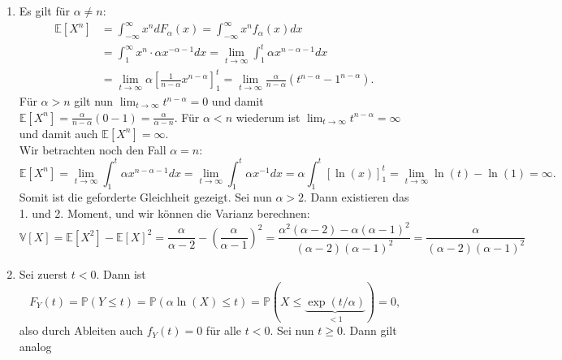 \documentclass[a4paper]{article}
\begin{document}
\begin{enumerate}[label=(\alph*)]
	\item Es gilt für $\alpha \neq n$:
	      \begin{align*}
		      \mathds{E}[X^n] & = \int_{-\infty}^{\infty} x^n dF_\alpha(x) = \int_{-\infty}^{\infty} x^n f_\alpha(x) dx                                                                                             \\
		                      & = \int_{1}^{\infty} x^n \cdot \alpha x^{-\alpha - 1} dx = \lim_{t \to \infty} \int_{1}^{t} \alpha x^{n - \alpha - 1} dx                                                             \\
		                      & = \lim_{t \to \infty} \alpha \left[\frac{1}{n - \alpha} x^{n - \alpha}\right]_1^t = \lim_{t \to \infty} \frac{\alpha}{n - \alpha} \left(t^{n-\alpha} - 1^{n-\alpha}\right) \text{.}
	      \end{align*}
	      Für $\alpha > n$ gilt nun $\lim_{t \to \infty} t^{n - \alpha} = 0$ und damit $\mathds{E}[X^n] = \frac{\alpha}{n - \alpha} (0 - 1) = \frac{\alpha}{\alpha - n}$. Für $\alpha < n$ wiederum ist $\lim_{t \to \infty} t^{n - \alpha} = \infty$ und damit auch $\mathds{E}[X^n] = \infty$. \\
	      Wir betrachten noch den Fall $\alpha = n$:
	      \begin{equation*}
		      \mathds{E}[X^n] = \lim_{t \to \infty} \int_{1}^{t} \alpha x^{n - \alpha - 1} dx = \lim_{t \to \infty} \int_{1}^t \alpha x^{-1} dx = \alpha \int_{1}^t \left[\ln(x)\right]_1^t = \lim_{t \to \infty} \ln(t)  - \ln(1) = \infty\text{.}
	      \end{equation*}
	      Somit ist die geforderte Gleichheit gezeigt. Sei nun $\alpha > 2$. Dann existieren das 1. und 2. Moment, und wir können die Varianz berechnen:
	      \begin{equation*}
		      \mathds{V}[X] = \mathds{E}[X^2] - \mathds{E}[X]^2 = \frac{\alpha}{\alpha - 2} - \left(\frac{\alpha}{\alpha - 1}\right)^2 = \frac{\alpha^2(\alpha-2) - \alpha (\alpha-1)^2}{(\alpha - 2)(\alpha - 1)^2} = \frac{\alpha}{(\alpha - 2)(\alpha - 1)^2}
	      \end{equation*}
	\item Sei zuerst $t < 0$. Dann ist
	      \begin{equation*}
		      F_Y(t) = \mathds{P}(Y \leq t) = \mathds{P}(\alpha \ln(X) \leq t) = \mathds{P}(X \leq \underbrace{\exp(t/\alpha)}_{<1}) = 0\text{,}
	      \end{equation*}
	      also durch Ableiten auch $f_Y(t) = 0$ für alle $t<0$. Sei nun $t \geq 0$. Dann gilt analog

\end{enumerate}
\end{document}
